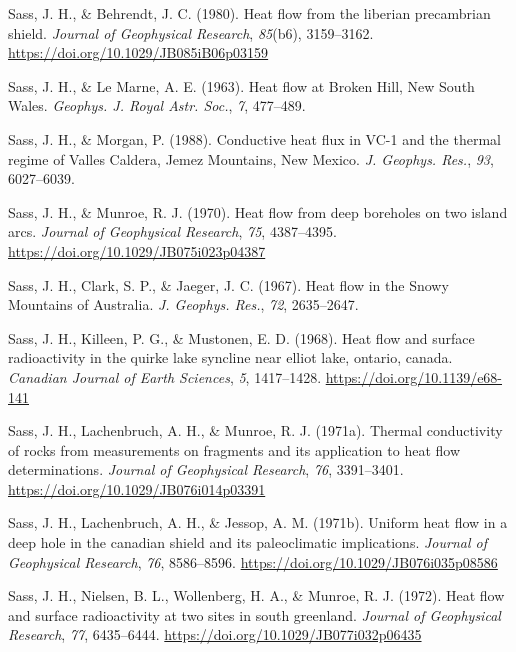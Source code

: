\begin{CSLReferences}{1}{1}
\leavevmode{}%
Sass, J. H., \& Behrendt, J. C. (1980). Heat flow from the liberian precambrian shield. \emph{Journal of Geophysical Research}, \emph{85}(b6), 3159--3162. \url{https://doi.org/10.1029/JB085iB06p03159}

\leavevmode{}%
Sass, J. H., \& Le Marne, A. E. (1963). Heat flow at {Broken Hill, New South Wales}. \emph{Geophys. J. Royal Astr. Soc.}, \emph{7}, 477--489.

\leavevmode{}%
Sass, J. H., \& Morgan, P. (1988). Conductive heat flux in VC-1 and the thermal regime of {Valles Caldera, Jemez Mountains, New Mexico}. \emph{J. Geophys. Res.}, \emph{93}, 6027--6039.

\leavevmode{}%
Sass, J. H., \& Munroe, R. J. (1970). Heat flow from deep boreholes on two island arcs. \emph{Journal of Geophysical Research}, \emph{75}, 4387--4395. \url{https://doi.org/10.1029/JB075i023p04387}

\leavevmode{}%
Sass, J. H., Clark, S. P., \& Jaeger, J. C. (1967). Heat flow in the {Snowy Mountains of Australia}. \emph{J. Geophys. Res.}, \emph{72}, 2635--2647.

\leavevmode{}%
Sass, J. H., Killeen, P. G., \& Mustonen, E. D. (1968). Heat flow and surface radioactivity in the quirke lake syncline near elliot lake, ontario, canada. \emph{Canadian Journal of Earth Sciences}, \emph{5}, 1417--1428. \url{https://doi.org/10.1139/e68-141}

\leavevmode{}%
Sass, J. H., Lachenbruch, A. H., \& Munroe, R. J. (1971a). Thermal conductivity of rocks from measurements on fragments and its application to heat flow determinations. \emph{Journal of Geophysical Research}, \emph{76}, 3391--3401. \url{https://doi.org/10.1029/JB076i014p03391}

\leavevmode{}%
Sass, J. H., Lachenbruch, A. H., \& Jessop, A. M. (1971b). Uniform heat flow in a deep hole in the canadian shield and its paleoclimatic implications. \emph{Journal of Geophysical Research}, \emph{76}, 8586--8596. \url{https://doi.org/10.1029/JB076i035p08586}

\leavevmode{}%
Sass, J. H., Nielsen, B. L., Wollenberg, H. A., \& Munroe, R. J. (1972). Heat flow and surface radioactivity at two sites in south greenland. \emph{Journal of Geophysical Research}, \emph{77}, 6435--6444. \url{https://doi.org/10.1029/JB077i032p06435}


\end{CSLReferences}
